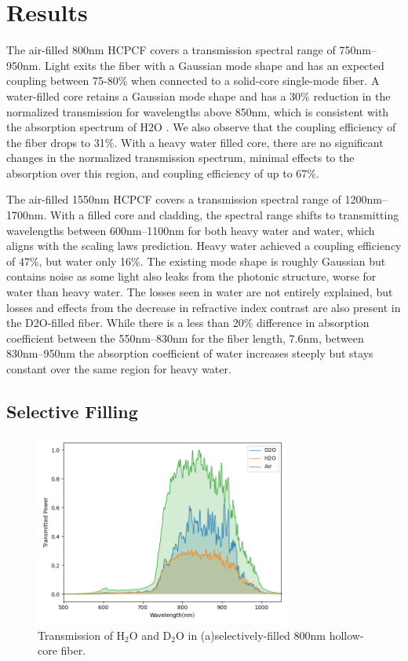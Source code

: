 \section{Results}
The air-filled 800nm HCPCF covers a transmission spectral range of 750nm–950nm. Light exits the fiber with a Gaussian mode shape and has an expected coupling between 75-80\% when connected to a solid-core single-mode fiber. A water-filled core retains a Gaussian mode shape and has a 30\% reduction in the normalized transmission for wavelengths above 850nm, which is consistent with the absorption spectrum of H2O \cite{kedenburg}. We also observe that the coupling efficiency of the fiber drops to 31\%. With a heavy water filled core, there are no significant changes in the normalized transmission spectrum, minimal effects to the absorption over this region, and coupling efficiency of up to 67\%.

The air-filled 1550nm HCPCF covers a transmission spectral range of 1200nm–1700nm. With a filled core and cladding, the spectral range shifts to transmitting wavelengths between 600nm–1100nm for both heavy water and water, which aligns with the scaling laws prediction. Heavy water achieved a coupling efficiency of 47\%, but water only 16\%. The existing mode shape is roughly Gaussian but contains noise as some light also leaks from the photonic structure, worse for water than heavy water. The losses seen in water are not entirely explained, but losses and effects from the decrease in refractive index contrast are also present in the D2O-filled fiber. While there is a less than 20\% difference in absorption coefficient between the 550nm–830nm for the fiber length, 7.6nm, between 830nm–950nm the absorption coefficient of water increases steeply but stays constant over the same region for heavy water. 
\subsection{Selective Filling}
\begin{figure}[!htb]
	\centering
	\includegraphics[width=0.75\textwidth]{./Figures/fiberfilling/HC800/transmission.png}
	\caption{Transmission of H${}_2$O and D${}_2$O in (a)selectively-filled 800nm hollow-core fiber.}
	\label{fig:trans 800hc}
\end{figure}
\clearpage

